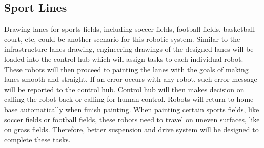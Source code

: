 \subsection{Sport Lines}
Drawing lanes for sports fields, including soccer fields, football fields, basketball court, etc, could be another scenario for this robotic system. Similar to the infrastructure lanes drawing, engineering drawings of the designed lanes will be loaded into the control hub which will assign tasks to each individual robot. These robots will then proceed to painting the lanes with the goals of making lanes smooth and straight. If an error occurs with any robot, such error message will be reported to the control hub. Control hub will then makes decision on calling the robot back or calling for human control. Robots will return to home base automatically when finish painting. When painting certain sports fields, like soccer fields or football fields, these robots need to travel on uneven surfaces, like on grass fields. Therefore, better suspension and drive system will be designed to complete these tasks.
